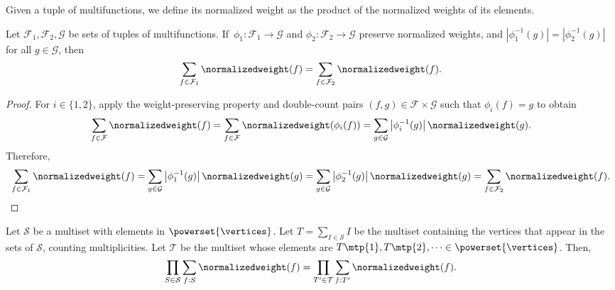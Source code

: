 Given a tuple of multifunctions, we define its normalized weight as the product of the normalized weights of its elements.

\begin{lemm} \label{lemma:preimage}
    Let \(\mathcal{F}_1, \mathcal{F}_2, \mathcal{G}\) be sets of tuples of multifunctions.
    If~\(\phi_1 \colon \mathcal{F}_1 \to \mathcal{G}\) and
    \(\phi_2 \colon \mathcal{F}_2 \to \mathcal{G}\) preserve normalized weights, and
    \( |\phi_1^{-1}(g)| = |\phi_2^{-1}(g)| \) for all \(g \in \mathcal{G}\), then
    \begin{equation*}
        \sum_{f \in \mathcal{F}_1} \normalizedweight(f) = \sum_{f \in \mathcal{F}_2} \normalizedweight(f).
    \end{equation*} 
\end{lemm}

\begin{proof}
    For \(i \in \{1, 2\}\), apply the weight-preserving property and double-count pairs \((f, g) \in \mathcal{F} \times \mathcal{G}\) such that \(\phi_i(f) = g\) to obtain
    \begin{equation*}
        \sum_{f \in \mathcal{F}} \normalizedweight(f) =
        \sum_{f \in \mathcal{F}} \normalizedweight(\phi_i(f)) =
        \sum_{g \in \mathcal{G}} \left| \phi_i^{-1}(g) \right| \normalizedweight(g).
    \end{equation*} 
    Therefore,
    \begin{equation*}
        \sum_{f \in \mathcal{F}_1} \normalizedweight(f) =
        \sum_{g \in \mathcal{G}} \left| \phi_1^{-1}(g) \right| \normalizedweight(g) = 
        \sum_{g \in \mathcal{G}} \left| \phi_2^{-1}(g) \right| \normalizedweight(g) = 
        \sum_{f \in \mathcal{F}_2} \normalizedweight(f). \qedhere
    \end{equation*} 
\end{proof}

\begin{lemm} \label{lemma:multiset:decomposition}
    Let \(\mathcal{S}\) be a multiset with elements in \(\powerset{\vertices}\).
    Let \(T = \sum_{I \in \mathcal{S}} I\) be the multiset containing the vertices that appear in the sets of \(\mathcal{S}\), counting multiplicities.
    Let \(\mathcal{T}\) be the multiset whose elements are \(T\mtp{1}, T\mtp{2}, \dots \in \powerset{\vertices}\).
    Then,
    \begin{equation*} \label{eq:multiset:decomposition:nwt}
        \prod_{S \in \mathcal{S}} \sum_{f : S} \normalizedweight(f) = \prod_{T' \in \mathcal{T}} \sum_{f : T'} \normalizedweight(f).
    \end{equation*}
\end{lemm}

